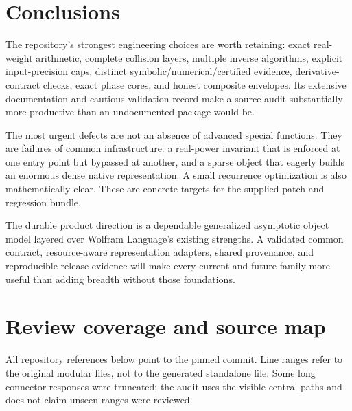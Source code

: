 \documentclass[11pt,letterpaper]{article}
\begin{document}
\section{Conclusions}
The repository's strongest engineering choices are worth retaining: exact real-weight arithmetic, complete collision layers, multiple inverse algorithms, explicit input-precision caps, distinct symbolic/numerical/certified evidence, derivative-contract checks, exact phase cores, and honest composite envelopes. Its extensive documentation and cautious validation record make a source audit substantially more productive than an undocumented package would be.\cite{guide,incremental,operations,native,certificates,validation}

The most urgent defects are not an absence of advanced special functions. They are failures of common infrastructure: a real-power invariant that is enforced at one entry point but bypassed at another, and a sparse object that eagerly builds an enormous dense native representation. A small recurrence optimization is also mathematically clear. These are concrete targets for the supplied patch and regression bundle.

The durable product direction is a dependable generalized asymptotic object model layered over Wolfram Language's existing strengths. A validated common contract, resource-aware representation adapters, shared provenance, and reproducible release evidence will make every current and future family more useful than adding breadth without those foundations.

\appendix
\section{Review coverage and source map}\label{app:coverage}
All repository references below point to the pinned commit. Line ranges refer to the original modular files, not to the generated standalone file. Some long connector responses were truncated; the audit uses the visible central paths and does not claim unseen ranges were reviewed.
\end{document}
